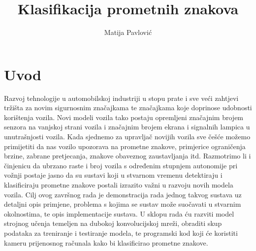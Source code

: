 \documentclass[times, utf8, zavrsni]{fer}
\begin{document}

\title{Klasifikacija prometnih znakova}

\author{Matija Pavlović}

\maketitle

\izvornik

\zahvala{}

\tableofcontents

\chapter{Uvod}
Razvoj tehnologije u automobilskoj industriji u stopu prate i sve veći zahtjevi tržišta za novim sigurnosnim značajkama te značajkama koje doprinose udobnosti korištenja vozila. Novi modeli vozila tako postaju opremljeni značajnim brojem senzora na vanjskoj strani vozila i značajnim brojem ekrana i signalnih lampica u unutrašnjosti vozila. Kada sjednemo za upravljač novijih vozila sve češće možemo primijetiti da nas vozilo upozorava na prometne znakove, primjerice ograničenja brzine, zabrane pretjecanja, znakove obaveznog zaustavljanja itd. Razmotrimo li i činjenicu da ubrzano raste i broj vozila s određenim stupnjem autonomije pri vožnji postaje jasno da su sustavi koji u stvarnom vremenu detektiraju i klasificiraju prometne znakove postali izrazito važni u razvoju novih modela vozila. Cilj ovog završnog rada je demonstracija rada jednog takvog sustava uz detaljni opis primjene, problema s kojima se sustav može suočavati u stvarnim okolnostima, te opis implementacije sustava. U sklopu rada ću razviti model strojnog učenja temeljen na dubokoj konvolucijskoj mreži, obraditi skup podataka za treniranje i testiranje modela, te programski kod koji će koristiti kameru prijenosnog računala kako bi klasificirao prometne znakove.
\end{document}
